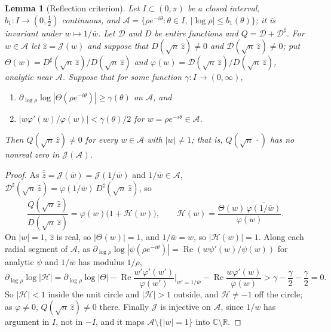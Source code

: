 \documentclass[11pt]{amsart}
\newtheorem{lemma}[theorem]{Lemma}
\theoremstyle{definition}
\theoremstyle{remark}
\numberwithin{equation}{section}
\newcommand{\C}{\mathbb{C}}
\newcommand{\R}{\mathbb{R}}
\DeclareMathOperator{\re}{Re}
\begin{document}
\begin{lemma}[Reflection criterion]\label{lem:near1-reflection}
Let $I\subset(0,\pi)$ be a closed interval, $b_1:I\to(0,\frac12)$ continuous, and $\mathcal A=\{\rho e^{-i\theta}:\theta\in I,\ |\log\rho|\le b_1(\theta)\}$; it is invariant under $w\mapsto1/\bar w$. Let $\mathcal D$ and $D$ be entire functions and $Q=\mathcal D+\mathcal D^\sharp$. For $w\in\mathcal A$ let $\hat z=\mathcal J(w)$ and suppose that $D(\sqrt n\,\hat z)\ne0$ and $\mathcal D(\sqrt n\,\hat z)\ne0$; put $\Theta(w)=D^\sharp(\sqrt n\,\hat z)/D(\sqrt n\,\hat z)$ and $\varphi(w)=\mathcal D(\sqrt n\,\hat z)/D(\sqrt n\,\hat z)$, analytic near $\mathcal A$. Suppose that for some function $\gamma:I\to(0,\infty)$,
\begin{enumerate}
\item[(i)] $\partial_{\log\rho}\log|\Theta(\rho e^{-i\theta})|\ge\gamma(\theta)$ on $\mathcal A$, and
\item[(ii)] $|w\varphi'(w)/\varphi(w)|<\gamma(\theta)/2$ for $w=\rho e^{-i\theta}\in\mathcal A$.
\end{enumerate}
Then $Q(\sqrt n\,\hat z)\ne0$ for every $w\in\mathcal A$ with $|w|\ne1$; that is, $Q(\sqrt n\,\cdot)$ has no nonreal zero in $\mathcal J(\mathcal A)$.
\end{lemma}

\begin{proof}
As $\overline{\hat z}=\mathcal J(\bar w)=\mathcal J(1/\bar w)$ and $1/\bar w\in\mathcal A$, $\mathcal D^\sharp(\sqrt n\,\hat z)=\overline{\varphi(1/\bar w)}\,D^\sharp(\sqrt n\,\hat z)$, so
\[
\frac{Q(\sqrt n\,\hat z)}{D(\sqrt n\,\hat z)}=\varphi(w)\bigl(1+\mathcal H(w)\bigr),\qquad\mathcal H(w)=\frac{\Theta(w)\,\overline{\varphi(1/\bar w)}}{\varphi(w)}.
\]
On $|w|=1$, $\hat z$ is real, so $|\Theta(w)|=1$, and $1/\bar w=w$, so $|\mathcal H(w)|=1$. Along each radial segment of $\mathcal A$, as $\partial_{\log\rho}\log|\psi(\rho e^{-i\theta})|=\re(w\psi'(w)/\psi(w))$ for analytic $\psi$ and $1/\bar w$ has modulus $1/\rho$,
\[
\partial_{\log\rho}\log|\mathcal H|=\partial_{\log\rho}\log|\Theta|-\re\frac{w'\varphi'(w')}{\varphi(w')}\Big|_{w'=1/\bar w}-\re\frac{w\varphi'(w)}{\varphi(w)}>\gamma-\frac\gamma2-\frac\gamma2=0 .
\]
So $|\mathcal H|<1$ inside the unit circle and $|\mathcal H|>1$ outside, and $\mathcal H\ne-1$ off the circle; as $\varphi\ne0$, $Q(\sqrt n\,\hat z)\ne0$ there. Finally $\mathcal J$ is injective on $\mathcal A$, since $1/w$ has argument in $I$, not in $-I$, and it maps $\mathcal A\setminus\{|w|=1\}$ into $\C\setminus\R$.
\end{proof}
\end{document}
